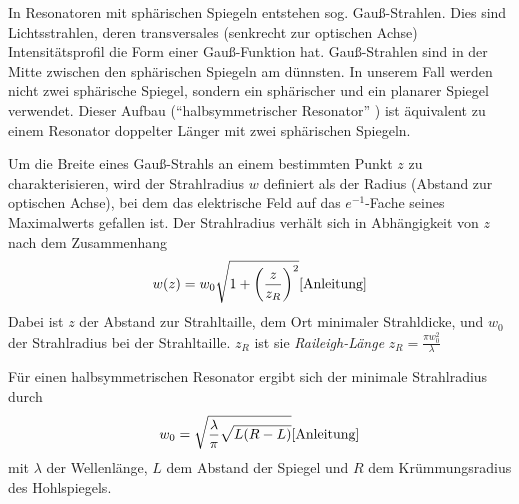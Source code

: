 \documentclass{article}
\begin{document}
In Resonatoren mit sphärischen Spiegeln entstehen sog. Gauß-Strahlen. Dies sind Lichtsstrahlen, deren transversales
(senkrecht zur optischen Achse) Intensitätsprofil die Form einer Gauß-Funktion hat.
Gauß-Strahlen sind in der Mitte zwischen den sphärischen Spiegeln am dünnsten. In unserem Fall werden nicht
zwei sphärische Spiegel, sondern ein sphärischer und ein planarer Spiegel verwendet.
Dieser Aufbau (\enquote{halbsymmetrischer Resonator} \cite{Anleitung}) ist äquivalent
zu einem Resonator doppelter Länger mit zwei sphärischen Spiegeln. 

Um die Breite eines Gauß-Strahls an einem bestimmten Punkt $z$ zu charakterisieren,
wird der Strahlradius $w$ definiert als der Radius (Abstand zur optischen Achse),
bei dem das elektrische Feld auf das $e^{-1}$-Fache seines Maximalwerts gefallen ist.
Der Strahlradius verhält sich in Abhängigkeit von $z$ nach dem Zusammenhang
\begin{equation}
  w(z) = w_0 \sqrt{1+\left( \frac{z}{z_R} \right)^2} \cite{Anleitung}
\end{equation}
Dabei ist $z$ der Abstand zur Strahltaille, dem Ort minimaler Strahldicke, und $w_0$ der Strahlradius bei der Strahltaille.
$z_R$ ist sie \textit{Raileigh-Länge} $z_R = \frac{\pi w_0^2}{\lambda}$

Für einen halbsymmetrischen Resonator ergibt sich der minimale Strahlradius durch
\begin{equation}
  w_0 = \sqrt{\frac{\lambda}{\pi} \sqrt{L(R-L)}} \cite{Anleitung}
\end{equation}
mit $\lambda$ der Wellenlänge, $L$ dem Abstand der Spiegel und $R$ dem Krümmungsradius des Hohlspiegels.
\end{document}

